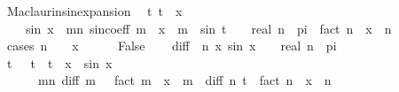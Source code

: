 \begin{isabellebody}
\endisatagproof
{\isafoldproof}%
%
\isadelimproof
\isanewline
%
\endisadelimproof
\isanewline
{}\isamarkupfalse%
\ Maclaurin{\isacharunderscore}{\kern0pt}sin{\isacharunderscore}{\kern0pt}expansion{}{\isacharcolon}{\kern0pt}\isanewline
\ \ {\isachardoublequoteopen}{\isasymexists}t{\isachardot}{\kern0pt}\ {\isasymbar}t{\isasymbar}\ {\isasymle}\ {\isasymbar}x{\isasymbar}\ {\isasymand}\isanewline
\ \ \ \ sin\ x\ {\isacharequal}{\kern0pt}\ {\isacharparenleft}{\kern0pt}{\isasymSum}m{\isacharless}{\kern0pt}n{\isachardot}{\kern0pt}\ sin{\isacharunderscore}{\kern0pt}coeff\ m\ {\isacharasterisk}{\kern0pt}\ x\ {\isacharcircum}{\kern0pt}\ m{\isacharparenright}{\kern0pt}\ {\isacharplus}{\kern0pt}\ {\isacharparenleft}{\kern0pt}sin\ {\isacharparenleft}{\kern0pt}t\ {\isacharplus}{\kern0pt}\ {}{\isacharslash}{\kern0pt}{}\ {\isacharasterisk}{\kern0pt}\ real\ n\ {\isacharasterisk}{\kern0pt}\ pi{\isacharparenright}{\kern0pt}\ {\isacharslash}{\kern0pt}\ fact\ n{\isacharparenright}{\kern0pt}\ {\isacharasterisk}{\kern0pt}\ x\ {\isacharcircum}{\kern0pt}\ n{\isachardoublequoteclose}\isanewline
%
\isadelimproof
%
\endisadelimproof
%
\isatagproof
{}\isamarkupfalse%
\ {\isacharparenleft}{\kern0pt}cases\ {\isachardoublequoteopen}n\ {\isacharequal}{\kern0pt}\ {}\ {\isasymor}\ x\ {\isacharequal}{\kern0pt}\ {}{\isachardoublequoteclose}{\isacharparenright}{\kern0pt}\isanewline
\ \ \isamarkupfalse%
\ False\isanewline
\ \ \isamarkupfalse%
\ {\isacharquery}{\kern0pt}diff\ {\isacharequal}{\kern0pt}\ {\isachardoublequoteopen}{\isasymlambda}n\ x{\isachardot}{\kern0pt}\ sin\ {\isacharparenleft}{\kern0pt}x\ {\isacharplus}{\kern0pt}\ {}{\isacharslash}{\kern0pt}{}\ {\isacharasterisk}{\kern0pt}\ real\ n\ {\isacharasterisk}{\kern0pt}\ pi{\isacharparenright}{\kern0pt}{\isachardoublequoteclose}\isanewline
\ \ \isamarkupfalse%
\ {\isachardoublequoteopen}{\isasymexists}t{\isachardot}{\kern0pt}\ {}\ {\isacharless}{\kern0pt}\ {\isasymbar}t{\isasymbar}\ {\isasymand}\ {\isasymbar}t{\isasymbar}\ {\isacharless}{\kern0pt}\ {\isasymbar}x{\isasymbar}\ {\isasymand}\ sin\ x\ {\isacharequal}{\kern0pt}\isanewline
\ \ \ \ \ \ {\isacharparenleft}{\kern0pt}{\isasymSum}m{\isacharless}{\kern0pt}n{\isachardot}{\kern0pt}\ {\isacharparenleft}{\kern0pt}{\isacharquery}{\kern0pt}diff\ m\ {}\ {\isacharslash}{\kern0pt}\ fact\ m{\isacharparenright}{\kern0pt}\ {\isacharasterisk}{\kern0pt}\ x\ {\isacharcircum}{\kern0pt}\ m{\isacharparenright}{\kern0pt}\ {\isacharplus}{\kern0pt}\ {\isacharparenleft}{\kern0pt}{\isacharquery}{\kern0pt}diff\ n\ t\ {\isacharslash}{\kern0pt}\ fact\ n{\isacharparenright}{\kern0pt}\ {\isacharasterisk}{\kern0pt}\ x\ {\isacharcircum}{\kern0pt}\ n{\isachardoublequoteclose}\isanewline

\end{isabellebody}
